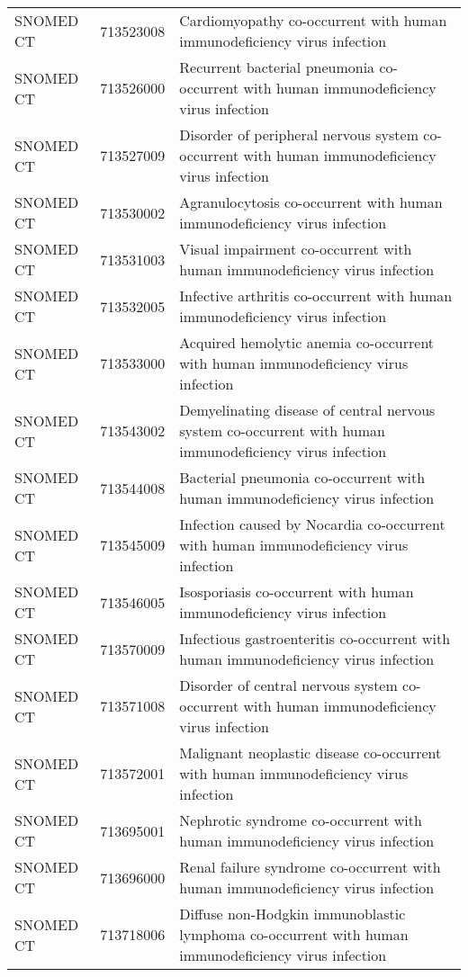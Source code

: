 \begin{table}[ht]
\begin{tabular}{lll}
  SNOMED CT & 713523008 & Cardiomyopathy co-occurrent with human immunodeficiency virus infection \\ 
  SNOMED CT & 713526000 & Recurrent bacterial pneumonia co-occurrent with human immunodeficiency virus infection \\ 
  SNOMED CT & 713527009 & Disorder of peripheral nervous system co-occurrent with human immunodeficiency virus infection \\ 
  SNOMED CT & 713530002 & Agranulocytosis co-occurrent with human immunodeficiency virus infection \\ 
  SNOMED CT & 713531003 & Visual impairment co-occurrent with human immunodeficiency virus infection \\ 
  SNOMED CT & 713532005 & Infective arthritis co-occurrent with human immunodeficiency virus infection \\ 
  SNOMED CT & 713533000 & Acquired hemolytic anemia co-occurrent with human immunodeficiency virus infection \\ 
  SNOMED CT & 713543002 & Demyelinating disease of central nervous system co-occurrent with human immunodeficiency virus infection \\ 
  SNOMED CT & 713544008 & Bacterial pneumonia co-occurrent with human immunodeficiency virus infection \\ 
  SNOMED CT & 713545009 & Infection caused by Nocardia co-occurrent with human immunodeficiency virus infection \\ 
  SNOMED CT & 713546005 & Isosporiasis co-occurrent with human immunodeficiency virus infection \\ 
  SNOMED CT & 713570009 & Infectious gastroenteritis co-occurrent with human immunodeficiency virus infection \\ 
  SNOMED CT & 713571008 & Disorder of central nervous system co-occurrent with human immunodeficiency virus infection \\ 
  SNOMED CT & 713572001 & Malignant neoplastic disease co-occurrent with human immunodeficiency virus infection \\ 
  SNOMED CT & 713695001 & Nephrotic syndrome co-occurrent with human immunodeficiency virus infection \\ 
  SNOMED CT & 713696000 & Renal failure syndrome co-occurrent with human immunodeficiency virus infection \\ 
  SNOMED CT & 713718006 & Diffuse non-Hodgkin immunoblastic lymphoma co-occurrent with human immunodeficiency virus infection \\ 

\end{tabular}
\end{table}
